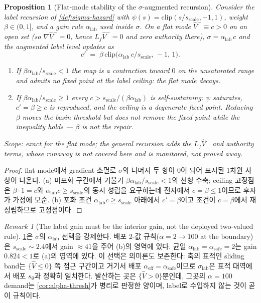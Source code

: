 \documentclass[11pt]{article}
\theoremstyle{plain}
\newtheorem{proposition}[theorem]{Proposition}
\theoremstyle{definition}
\theoremstyle{remark}
\newtheorem{remark}[theorem]{Remark}
\newcommand{\Vhat}{\widehat V}
\newcommand{\Lf}{L_f}
\newcommand{\grad}{\nabla}
\begin{document}
\begin{proposition}[Flat-mode stability of the $\sigma$-augmented recursion]\label{prop:sigma-stable}
Consider the label recursion of \cref{def:sigma-hazard} with
$\psi(s)=\mathrm{clip}(s/s_{\mathrm{scale}},-1,1)$, weight $\beta\in(0,1]$, and a gain rule
$\alpha_{\mathrm{lab}}$ used inside $\sigma$. On a \emph{flat mode} $\Vhat^-\equiv c>0$ on an
open set (so $\grad\Vhat^-=0$, hence $\Lf\Vhat^-=0$ and zero authority there),
$\sigma=\alpha_{\mathrm{lab}}\,c$ and the augmented label level updates as
\[
  c'\;=\;\beta\,\mathrm{clip}\!\big(\alpha_{\mathrm{lab}}\,c/s_{\mathrm{scale}},\,-1,\,1\big).
\]
\begin{enumerate}[label=(\alph*)]
\item If $\beta\alpha_{\mathrm{lab}}/s_{\mathrm{scale}}<1$ the map is a contraction toward $0$
on the unsaturated range and admits \emph{no} fixed point at the label ceiling: the flat mode
decays.
\item If $\beta\alpha_{\mathrm{lab}}/s_{\mathrm{scale}}\ge1$ every
$c>s_{\mathrm{scale}}/(\beta\alpha_{\mathrm{lab}})$ is self-sustaining: $\psi$ saturates,
$c'=\beta\ge c$ is reproduced, and the ceiling is a degenerate fixed point. Reducing $\beta$
moves the basin threshold but does not remove the fixed point while the inequality holds ---
$\beta$ is not the repair.
\end{enumerate}
Scope: exact for the flat mode; the general recursion adds the $\Lf\Vhat^-$ and authority
terms, whose runaway is not covered here and is monitored, not proved away.
\end{proposition}
\begin{proof}
flat mode에서 gradient 소멸로 $\sigma$의 나머지 두 항이 $0$이 되어 표시된 1차원 사상이
나온다. (a) 미포화 구간에서 기울기 $\beta\alpha_{\mathrm{lab}}/s_{\mathrm{scale}}<1$의 선형
수축; ceiling 고정점은 $\beta\cdot1=c$와 $\alpha_{\mathrm{lab}}c\ge s_{\mathrm{scale}}$의
동시 성립을 요구하는데 전자에서 $c=\beta\le1$이므로 후자가 가정에 모순. (b) 포화 조건
$\alpha_{\mathrm{lab}}c\ge s_{\mathrm{scale}}$ 아래에서 $c'=\beta$이고 조건이
$c=\beta$에서 재성립하므로 고정점이다.
\end{proof}

\begin{remark}[The label gain must be the interior gain, not the deployed two-valued rule]\label{rem:sigma-alpha-rule}
\cref{prop:sigma-stable}은 $\sigma$의 $\alpha_{\mathrm{lab}}$ 선택을 강제한다. 배포 2-값
규칙($\alpha=2\to100$ at the boundary)은 $s_{\mathrm{scale}}\sim2.4$에서 gain
$\approx41$을 주어 (b)의 영역에 있다. 균일 $\alpha_{\mathrm{lab}}=\alpha_{\mathrm{safe}}=2$는
gain $0.824<1$로 (a)의 영역에 있다. 이 선택은 의미론도 보존한다: 축의 표적인 sliding band는
$\{\Vhat\le0\}$ 쪽 접근 구간이고 거기서 배포 $\alpha_{\mathrm{eff}}=\alpha_{\mathrm{safe}}$이므로
$\sigma_{\mathrm{lab}}$은 표적 대역에서 배포 $s_\emptyset$과 정확히 일치한다. 발산하는 곳은
$\{\Vhat>0\}$뿐인데, 그곳의 $\alpha{=}100$ demand는 \cref{cor:alpha-thresh}가 병리로 판정한
양이며, label로 수입하지 않는 것이 곧 이 규칙이다.
\end{remark}
\end{document}
